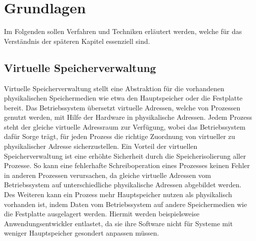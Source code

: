 \chapter{Grundlagen}
\label{chapter:basics}

Im Folgenden sollen Verfahren und Techniken erläutert werden, welche für das Verständnis der späteren Kapitel essenziell sind.  

\section{Virtuelle Speicherverwaltung}

Virtuelle Speicherverwaltung stellt eine Abstraktion für die vorhandenen physikalischen Speichermedien wie etwa den Hauptspeicher oder die Festplatte bereit.
Das Betriebssystem übersetzt virtuelle Adressen, welche von Prozessen genutzt werden, mit Hilfe der Hardware in physikalische Adressen. 
Jedem Prozess steht der gleiche virtuelle Adressraum zur Verfügung, wobei das Betriebssystem dafür Sorge trägt, für jeden Prozess die richtige Zuordnung von virtueller zu physikalischer Adresse sicherzustellen.
Ein Vorteil der virtuellen Speicherverwaltung ist eine erhöhte Sicherheit durch die Speicherisolierung aller Prozesse. 
So kann eine fehlerhafte Schreiboperation eines Prozesses keinen Fehler in anderen Prozessen verursachen, da gleiche virtuelle Adressen vom Betriebssystem auf unterschiedliche physikalische Adressen abgebildet werden. 
Des Weiteren kann ein Prozess mehr Hauptspeicher nutzen als physikalisch vorhanden ist, indem Daten vom Betriebssystem auf andere Speichermedien wie die Festplatte ausgelagert werden. Hiermit werden beispielsweise Anwendungsentwickler entlastet, da sie ihre Software nicht für Systeme mit weniger Hauptspeicher gesondert anpassen müssen. 

